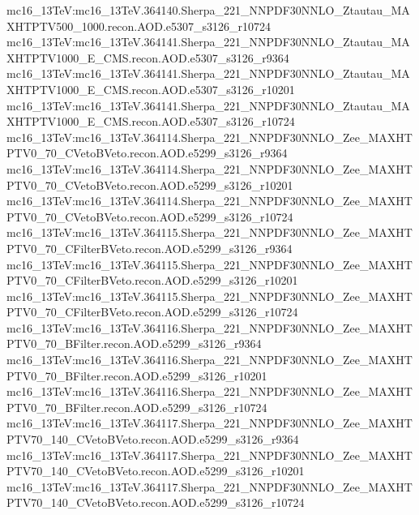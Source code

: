 { mc16\_13TeV:mc16\_13TeV.364140.Sherpa\_221\_NNPDF30NNLO\_Ztautau\_MAXHTPTV500\_1000.recon.AOD.e5307\_s3126\_r10724  \newline 
 mc16\_13TeV:mc16\_13TeV.364141.Sherpa\_221\_NNPDF30NNLO\_Ztautau\_MAXHTPTV1000\_E\_CMS.recon.AOD.e5307\_s3126\_r9364  \newline 
 mc16\_13TeV:mc16\_13TeV.364141.Sherpa\_221\_NNPDF30NNLO\_Ztautau\_MAXHTPTV1000\_E\_CMS.recon.AOD.e5307\_s3126\_r10201 \newline 
 mc16\_13TeV:mc16\_13TeV.364141.Sherpa\_221\_NNPDF30NNLO\_Ztautau\_MAXHTPTV1000\_E\_CMS.recon.AOD.e5307\_s3126\_r10724 \newline  
 mc16\_13TeV:mc16\_13TeV.364114.Sherpa\_221\_NNPDF30NNLO\_Zee\_MAXHTPTV0\_70\_CVetoBVeto.recon.AOD.e5299\_s3126\_r9364  \newline 
 mc16\_13TeV:mc16\_13TeV.364114.Sherpa\_221\_NNPDF30NNLO\_Zee\_MAXHTPTV0\_70\_CVetoBVeto.recon.AOD.e5299\_s3126\_r10201  \newline 
 mc16\_13TeV:mc16\_13TeV.364114.Sherpa\_221\_NNPDF30NNLO\_Zee\_MAXHTPTV0\_70\_CVetoBVeto.recon.AOD.e5299\_s3126\_r10724 \newline  
 mc16\_13TeV:mc16\_13TeV.364115.Sherpa\_221\_NNPDF30NNLO\_Zee\_MAXHTPTV0\_70\_CFilterBVeto.recon.AOD.e5299\_s3126\_r9364 \newline  
 mc16\_13TeV:mc16\_13TeV.364115.Sherpa\_221\_NNPDF30NNLO\_Zee\_MAXHTPTV0\_70\_CFilterBVeto.recon.AOD.e5299\_s3126\_r10201 \newline  
 mc16\_13TeV:mc16\_13TeV.364115.Sherpa\_221\_NNPDF30NNLO\_Zee\_MAXHTPTV0\_70\_CFilterBVeto.recon.AOD.e5299\_s3126\_r10724 \newline  
 mc16\_13TeV:mc16\_13TeV.364116.Sherpa\_221\_NNPDF30NNLO\_Zee\_MAXHTPTV0\_70\_BFilter.recon.AOD.e5299\_s3126\_r9364 \newline  
 mc16\_13TeV:mc16\_13TeV.364116.Sherpa\_221\_NNPDF30NNLO\_Zee\_MAXHTPTV0\_70\_BFilter.recon.AOD.e5299\_s3126\_r10201  \newline 
 mc16\_13TeV:mc16\_13TeV.364116.Sherpa\_221\_NNPDF30NNLO\_Zee\_MAXHTPTV0\_70\_BFilter.recon.AOD.e5299\_s3126\_r10724 \newline  
 mc16\_13TeV:mc16\_13TeV.364117.Sherpa\_221\_NNPDF30NNLO\_Zee\_MAXHTPTV70\_140\_CVetoBVeto.recon.AOD.e5299\_s3126\_r9364 \newline  
 mc16\_13TeV:mc16\_13TeV.364117.Sherpa\_221\_NNPDF30NNLO\_Zee\_MAXHTPTV70\_140\_CVetoBVeto.recon.AOD.e5299\_s3126\_r10201 \newline  
 mc16\_13TeV:mc16\_13TeV.364117.Sherpa\_221\_NNPDF30NNLO\_Zee\_MAXHTPTV70\_140\_CVetoBVeto.recon.AOD.e5299\_s3126\_r10724 \newline  
}
